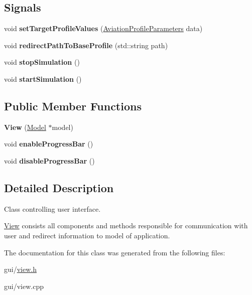 \subsection*{Signals}
\begin{DoxyCompactItemize}
\item 
\mbox{\label{class_view_a17beef462b991abf311bcaeacfe3b7d8}} 
void {\bfseries set\+Target\+Profile\+Values} (\hyperlink{struct_aviation_profile_parameters}{Aviation\+Profile\+Parameters} data)
\item 
\mbox{\label{class_view_a29594d0b3b97def30b5586ddaf11d288}} 
void {\bfseries redirect\+Path\+To\+Base\+Profile} (std\+::string path)
\item 
\mbox{\label{class_view_ae3633aa70a59017a0f3728a9a7e455bd}} 
void {\bfseries stop\+Simulation} ()
\item 
\mbox{\label{class_view_a83e2681b145ed9f9c900eeac251def36}} 
void {\bfseries start\+Simulation} ()
\end{DoxyCompactItemize}
\subsection*{Public Member Functions}
\begin{DoxyCompactItemize}
\item 
\mbox{\label{class_view_adc973dbae490e2040f813633e00b6e6f}} 
{\bfseries View} (\hyperlink{class_model}{Model} $\ast$model)
\item 
\mbox{\label{class_view_aea935ceb9d8f3d9b0153c6b9890c903f}} 
void {\bfseries enable\+Progress\+Bar} ()
\item 
\mbox{\label{class_view_a211d282520bc0d5373e3a2f57a611ffc}} 
void {\bfseries disable\+Progress\+Bar} ()
\end{DoxyCompactItemize}


\subsection{Detailed Description}
Class controlling user interface. 

\hyperlink{class_view}{View} consists all components and methods responsible for communication with user and redirect information to model of application. 

The documentation for this class was generated from the following files\+:\begin{DoxyCompactItemize}
\item 
gui/\hyperlink{view_8h}{view.\+h}\item 
gui/view.\+cpp\end{DoxyCompactItemize}
